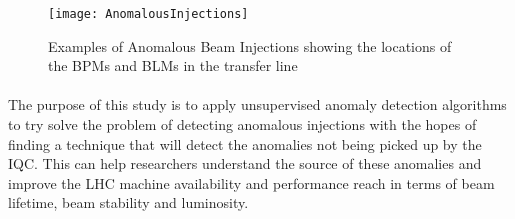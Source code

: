 \begin{figure}[t]
	\centering
	\texttt{[image: AnomalousInjections]}
	\caption[Anomalous Injections]{Examples of Anomalous Beam Injections showing the locations of the BPMs and BLMs in the transfer line}
	\label{fig::AnomalousInjections}
\end{figure}

\paragraph{ }The purpose of this study is to apply unsupervised anomaly detection algorithms to try solve the problem of detecting anomalous injections with the hopes of finding a technique that will detect the anomalies not being picked up by the \acs{IQC}. This can help researchers understand the source of these anomalies and improve the \acs{LHC} machine availability and performance reach in terms of beam lifetime, beam stability and luminosity.

